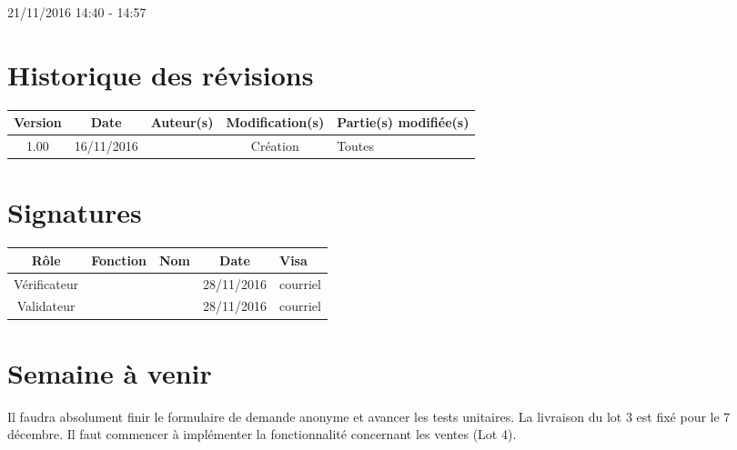 \documentclass [a4paper] {article}
\begin{document}
21/11/2016			 				%
\hfill   
\hfill 	 14:40 - 14:57				%



\section*{Historique des révisions}
\begin{center}
			\begin{tabular}{| c | c | c | c | p{4cm} |}
				\hline
				\rowcolor{Gray}
				Version & Date & Auteur(s) & Modification(s) & Partie(s) modifiée(s)		 \\
				\hline
				1.00 & 16/11/2016 & \Kafui & Création & Toutes \\
		\hline		
			\end{tabular}
		\end{center}

\section*{Signatures}

		\begin{center}
			\begin{tabular}{| c | c | c | c | p{4cm} |}
				\hline
				\rowcolor{Gray}
				Rôle & Fonction & Nom & Date & Visa		 \\
				\hline
				Vérificateur & \RQ & \Melissa & 28/11/2016 & courriel \\[30pt]
				\hline
				Validateur & \CP & \Pierre & 28/11/2016 & courriel \\[30pt]	
				\hline
			\end{tabular}
		\end{center}

\section{Semaine à venir}
Il faudra absolument finir le formulaire de demande anonyme et avancer les tests unitaires. 
La livraison du lot 3 est fixé pour le 7 décembre. Il faut commencer à implémenter la fonctionnalité concernant les ventes (Lot 4).



\end{document}
